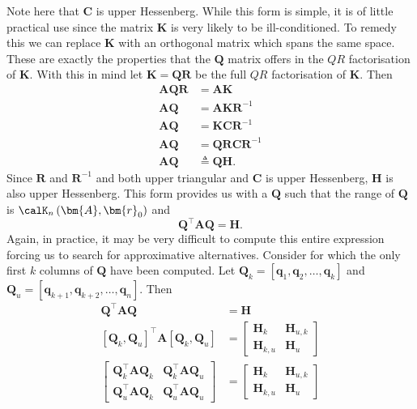 Note here that $\bm{C}$ is upper Hessenberg. While this form is simple, it is of little practical use since the matrix $\bm{K}$ is very likely to be ill-conditioned. To remedy this we can replace $\bm{K}$ with an orthogonal matrix which spans the same space. These are exactly the properties that the $\bm{Q}$ matrix offers in the $QR$ factorisation of $\bm{K}$. With this in mind let $\bm{K} = \bm{Q} \bm{R}$ be the full $QR$ factorisation of $\bm{K}$. Then
\begin{align*}
    \bm{A} \bm{Q} \bm{R} & = \bm{A} \bm{K}                    \\
    \bm{A} \bm{Q}        & = \bm{A} \bm{K} \bm{R}^{-1}        \\
    \bm{A} \bm{Q}        & = \bm{K} \bm{C} \bm{R}^{-1}        \\
    \bm{A} \bm{Q}        & = \bm{Q} \bm{R} \bm{C} \bm{R}^{-1} \\
    \bm{A} \bm{Q}        & \triangleq \bm{Q} \bm{H}.
\end{align*}
Since $\bm{R}$ and $\bm{R}^{-1}$ and both upper triangular and $\bm{C}$ is upper Hessenberg, $\bm{H}$ is also upper Hessenberg. This form provides us with a $\bm{Q}$ such that the range of $\bm{Q}$ is $\calK_{n} \left( \bm{A}, \bm{r}_0 \right)$ and
\begin{equation}\label{eq: QTAQ_eq_H}
    \bm{Q}^{\intercal} \bm{A} \bm{Q} = \bm{H}.
\end{equation}
Again, in practice, it may be very difficult to compute this entire expression forcing us to search for approximative alternatives. Consider  for which the only first $k$ columns of $\bm{Q}$ have been computed. Let $\bm{Q}_k = \left[ \bm{q}_1 , \bm{q}_2 , \ldots , \bm{q}_k \right]$ and $\bm{Q}_u = \left[ \bm{q}_{k+1} , \bm{q}_{k+2} , \ldots , \bm{q}_{n} \right]$. Then
\begin{align*}
    \bm{Q}^{\intercal} \bm{A} \bm{Q}                                                         & = \bm{H} \\
    \left[ \bm{Q}_k , \bm{Q}_u \right]^{\intercal} \bm{A} \left[ \bm{Q}_k , \bm{Q}_u \right] & =
    \begin{bmatrix}
        \bm{H}_k     & \bm{H}_{u,k} \\
        \bm{H}_{k,u} & \bm{H}_{u}
    \end{bmatrix}                                                                           \\
    \begin{bmatrix}
        \bm{Q}_{k}^{\intercal} \bm{A} \bm{Q}_{k} & \bm{Q}_{k}^{\intercal} \bm{A} \bm{Q}_{u} \\
        \bm{Q}_{u}^{\intercal} \bm{A} \bm{Q}_{k} & \bm{Q}_{u}^{\intercal} \bm{A} \bm{Q}_{u}
    \end{bmatrix}
                                                                                             & =
    \begin{bmatrix}
        \bm{H}_k     & \bm{H}_{u,k} \\
        \bm{H}_{k,u} & \bm{H}_{u}
    \end{bmatrix}
\end{align*}
